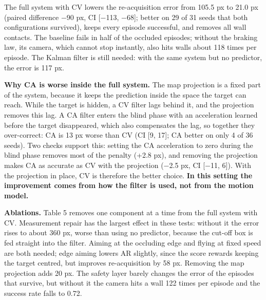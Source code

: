 \documentclass[12pt,a4paper]{article}
\begin{document}
The full system with CV lowers the re-acquisition error from 105.5 px to 21.0 px (paired difference $-$90 px, CI [$-$113, $-$68]; better on 29 of 31 seeds that both configurations survived), keeps every episode successful, and removes all wall contacts. The baseline fails in half of the occluded episodes; without the braking law, its camera, which cannot stop instantly, also hits walls about 118 times per episode. The Kalman filter is still needed: with the same system but no predictor, the error is 117 px.

\textbf{Why CA is worse inside the full system.} The map projection is a fixed part of the system, because it keeps the prediction inside the space the target can reach. While the target is hidden, a CV filter lags behind it, and the projection removes this lag. A CA filter enters the blind phase with an acceleration learned before the target disappeared, which also compensates the lag, so together they over-correct: CA is 13 px worse than CV (CI [9, 17]; CA better on only 4 of 36 seeds). Two checks support this: setting the CA acceleration to zero during the blind phase removes most of the penalty (+2.8 px), and removing the projection makes CA as accurate as CV with the projection ($-$2.5 px, CI [$-$11, 6]). With the projection in place, CV is therefore the better choice. \textbf{In this setting the improvement comes from how the filter is used, not from the motion model.}

\textbf{Ablations.} Table 5 removes one component at a time from the full system with CV. Measurement repair has the largest effect in these tests: without it the error rises to about 360 px, worse than using no predictor, because the cut-off box is fed straight into the filter. Aiming at the occluding edge and flying at fixed speed are both needed; edge aiming lowers AR slightly, since the score rewards keeping the target centred, but improves re-acquisition by 58 px. Removing the map projection adds 20 px. The safety layer barely changes the error of the episodes that survive, but without it the camera hits a wall 122 times per episode and the success rate falls to 0.72.
\end{document}
